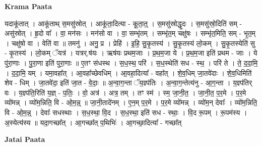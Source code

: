 \documentclass[17pt]{extarticle}
\begin{document}
\textbf{Krama Paata} \newline

यदाकू॑तात् । आकू॑ताथ् स॒मसु॑स्रोत् । आकू॑ता॒दित्या - कू॒ता॒त्॒ । स॒मसु॑स्रोद्धृ॒दः । स॒मसु॑स्रो॒दिति॑ सम् - असु॑स्रोत् । हृ॒दो वा᳚ । वा॒ मन॑सः । मन॑सो वा । वा॒ सम्भृ॑तम् । सम्भृ॑त॒म् चक्षु॑षः । सम्भृ॑त॒मिति॒ सम् - भृ॒त॒म् । चक्षु॑षो वा । वेति॑ वा ॥ तमनु॑ । अनु॒ प्र । प्रेहि॑ । इ॒हि॒ सु॒कृ॒तस्य॑ । सु॒कृ॒तस्य॑ लो॒कम् । सु॒कृ॒तस्येति॑ सु - कृ॒तस्य॑ । लो॒कम् ॅयत्र॑ । यत्रर्.ष॑यः । ऋष॑यः प्रथम॒जाः । प्र॒थ॒म॒जा ये । प्र॒थ॒म॒जा इति॑ प्रथम - जाः । ये पु॑रा॒णाः । पु॒रा॒णा इति॑ पुरा॒णाः ॥ ए॒तꣳ स॑धस्थ । स॒ध॒स्थ॒ परि॑ । स॒ध॒स्थेति॑ सध - स्थ॒ । परि॑ ते । ते॒ द॒दा॒मि॒ । द॒दा॒मि॒ यम् । यमा॒वहा᳚त् । आ॒वहा᳚च्छेवधिम् । आ॒वहा॒दित्या᳚ - वहा᳚त् । शे॒व॒धिम् जा॒तवे॑दाः । शे॒व॒धिमिति॑ शेव - धिम् । जा॒तवे॑दा॒ इति॑ जा॒त - वे॒दाः॒ ॥ अ॒न्वा॒ग॒न्ता ॅय॒ज्ञ्प॑तिः । अ॒न्वा॒ग॒न्तेत्य॑नु - आ॒ग॒न्ता । य॒ज्ञ्प॑तिर् वः । य॒ज्ञ्प॑ति॒रिति॑ य॒ज्ञ् - प॒तिः॒ । वो॒ अत्र॑ । अत्र॒ तम् । तꣳ स्म॑ । स्म॒ जा॒नी॒त॒ । जा॒नी॒त॒ प॒र॒मे । प॒र॒मे व्यो॑मन्न् । व्यो॑म॒न्निति॒ वि - ओ॒म॒न्न्॒ ॥ जा॒नी॒तादे॑नम् । ए॒न॒म् प॒र॒मे । प॒र॒मे व्यो॑मन्न् । व्यो॑म॒न् देवाः᳚ । व्यो॑म॒न्निति॒ वि - ओ॒म॒न्न्॒ । देवाः᳚ सधस्थाः । स॒ध॒स्था॒ वि॒द । स॒ध॒स्था॒ इति॑ सध - स्थाः॒ । वि॒द रू॒पम् । रू॒पम॑स्य । अ॒स्येत्य॑स्य ॥ यदा॒गच्छा᳚त् । आ॒गच्छा᳚त् प॒थिभिः॑ । आ॒गच्छा॒दित्या᳚ - गच्छा᳚त् \newline

\textbf{Jatai Paata} \newline
\end{document}
